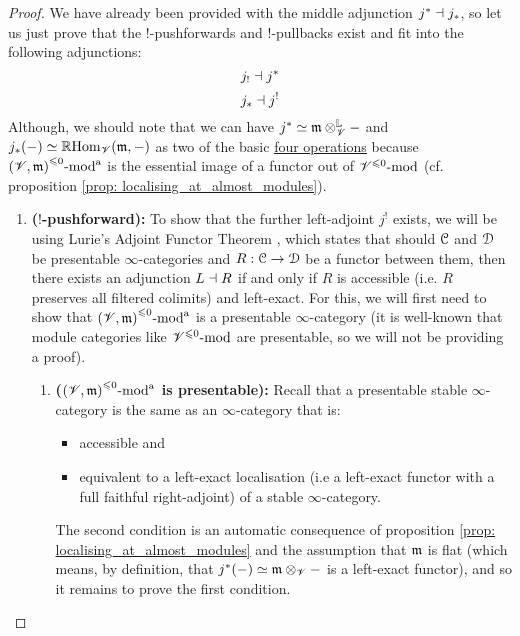                 \begin{proof}
                    We have already been provided with the middle adjunction $j^* \dashv j_*$, so let us just prove that the $!$-pushforwards and $!$-pullbacks exist and fit into the following adjunctions:
                        $$j_! \dashv j^*$$
                        $$j_* \dashv j^!$$
                    Although, we should note that we can have $j^* \cong \m \tensor_{\scrV}^{\L} -$ and $j_*(-) \simeq \mathbb{R}\mathrm{Hom}_{\mathscr{V}}(\mathfrak{m}, -)$ as two of the basic \href{https://ncatlab.org/nlab/show/six+operations}{\underline{four operations}} because ${(\mathscr{V}, \mathfrak{m})}^{\leqslant 0}\text{-}\mathrm{mod}^{\mathrm{a}}$ is the essential image of a functor out of ${\mathscr{V}}^{\leqslant 0}\text{-}\mathrm{mod}$ (cf. proposition \ref{prop: localising_at_almost_modules}). 
                        \begin{enumerate}
                            \item \textbf{($!$-pushforward):} To show that the further left-adjoint $j^!$ exists, we will be using Lurie's Adjoint Functor Theorem \cite[Corollary 5.5.2.9]{HTT}, which states that should $\mathcal{C}$ and $\mathcal{D}$ be presentable $\infty$-categories and $R: \mathcal{C} \to \mathcal{D}$ be a functor between them, then there exists an adjunction $L \dashv R$ if and only if $R$ is accessible (i.e. $R$ preserves all filtered colimits) and left-exact. For this, we will first need to show that ${(\mathscr{V}, \mathfrak{m})}^{\leqslant 0}\text{-}\mathrm{mod}^{\mathrm{a}}$ is a presentable $\infty$-category (it is well-known that module categories like ${\mathscr{V}}^{\leqslant 0}\text{-}\mathrm{mod}$ are presentable, so we will not be providing a proof).
                                \begin{enumerate}
                                    \item \textbf{(${(\mathscr{V}, \mathfrak{m})}^{\leqslant 0}\text{-}\mathrm{mod}^{\mathrm{a}}$ is presentable):} Recall that a presentable stable $\infty$-category is the same as an $\infty$-category that is:
                                        \begin{itemize}
                                            \item accessible and
                                            \item equivalent to a left-exact localisation (i.e a left-exact functor with a full faithful right-adjoint) of a stable $\infty$-category.
                                        \end{itemize}  
                                        
                                    The second condition is an automatic consequence of proposition \ref{prop: localising_at_almost_modules} and the assumption that $\mathfrak{m}$ is flat (which means, by definition, that $j^*(-) \cong \m \tensor_{\scrV} -$ is a left-exact functor), and so it remains to prove the first      condition. 
                                    

\end{enumerate}
\end{enumerate}
\end{proof}
